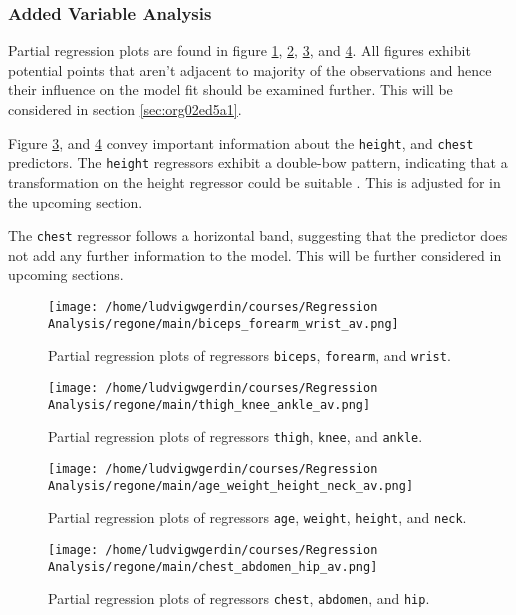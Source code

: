 \documentclass[11pt]{article}
\begin{document}
\subsubsection{Added Variable Analysis}
\label{sec:orge1a64be}

Partial regression plots are found in figure \ref{fig:org997597c}, \ref{fig:orgc26dade},
\ref{fig:orgc270064}, and \ref{fig:orgb733745}. All figures exhibit potential points 
that aren't adjacent to majority of the observations and hence their influence on the model fit should be 
examined further. This will be considered in section \ref{sec:org02ed5a1}.

Figure \ref{fig:orgc270064}, and \ref{fig:orgb733745} 
convey important information about the \texttt{height}, and \texttt{chest} predictors.
The \texttt{height} regressors exhibit a double-bow pattern, indicating that a transformation on 
the height regressor could be suitable \cite{Montgomery2012}. This is adjusted for in the upcoming section.

The \texttt{chest} regressor follows  a horizontal band, suggesting that the predictor does not add any
further information to the model. \cite{Montgomery2012} This will be further considered in upcoming sections.

\begin{figure}[htbp]
\centering
\texttt{[image: /home/ludvigwgerdin/courses/Regression Analysis/regone/main/biceps\_forearm\_wrist\_av.png]}
\caption{\label{fig:org997597c}
Partial regression plots of regressors \texttt{biceps}, \texttt{forearm}, and \texttt{wrist}.}
\end{figure}   

\begin{figure}[htbp]
\centering
\texttt{[image: /home/ludvigwgerdin/courses/Regression Analysis/regone/main/thigh\_knee\_ankle\_av.png]}
\caption{\label{fig:orgc26dade}
Partial regression plots of regressors \texttt{thigh}, \texttt{knee}, and \texttt{ankle}.}
\end{figure}

\begin{figure}[htbp]
\centering
\texttt{[image: /home/ludvigwgerdin/courses/Regression Analysis/regone/main/age\_weight\_height\_neck\_av.png]}
\caption{\label{fig:orgc270064}
Partial regression plots of regressors \texttt{age}, \texttt{weight}, \texttt{height}, and \texttt{neck}.}
\end{figure}

\begin{figure}[htbp]
\centering
\texttt{[image: /home/ludvigwgerdin/courses/Regression Analysis/regone/main/chest\_abdomen\_hip\_av.png]}
\caption{\label{fig:orgb733745}
Partial regression plots of regressors \texttt{chest}, \texttt{abdomen}, and \texttt{hip}.}
\end{figure}
\end{document}

